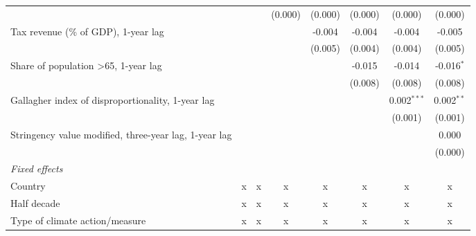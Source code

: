 \begin{tabular}{lccccccc}
                                                                             &              &              & (0.000)        & (0.000)        & (0.000)        & (0.000)        & (0.000)\\   
   Tax revenue (\% of GDP), 1-year lag                                       &              &              &                & -0.004         & -0.004         & -0.004         & -0.005\\   
                                                                             &              &              &                & (0.005)        & (0.004)        & (0.004)        & (0.005)\\   
   Share of population >65, 1-year lag                                       &              &              &                &                & -0.015         & -0.014         & -0.016$^{*}$\\   
                                                                             &              &              &                &                & (0.008)        & (0.008)        & (0.008)\\   
   Gallagher index of disproportionality, 1-year lag                         &              &              &                &                &                & 0.002$^{***}$  & 0.002$^{**}$\\   
                                                                             &              &              &                &                &                & (0.001)        & (0.001)\\   
   Stringency value modified, three-year lag, 1-year lag                     &              &              &                &                &                &                & 0.000\\   
                                                                             &              &              &                &                &                &                & (0.000)\\   
   \emph{Fixed effects}\\
   Country                                                                   & x            & x            & x              & x              & x              & x              & x\\  
   Half decade                                                               & x            & x            & x              & x              & x              & x              & x\\  
   Type of climate action/measure                                            & x            & x            & x              & x              & x              & x              & x\\  

\end{tabular}
